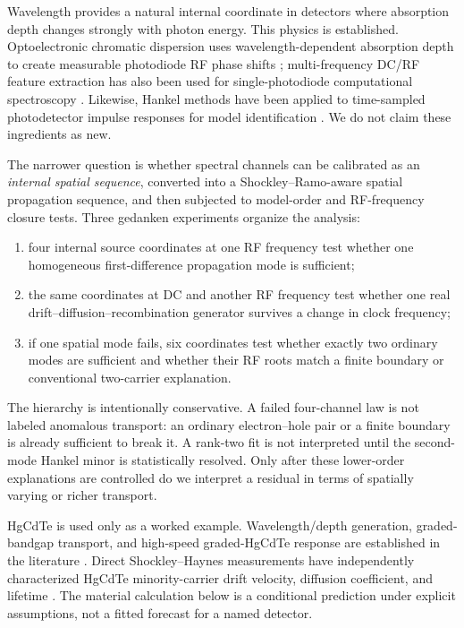 \documentclass[11pt]{article}
\begin{document}
Wavelength provides a natural internal coordinate in detectors where absorption depth changes strongly with photon energy. This physics is established. Optoelectronic chromatic dispersion uses wavelength-dependent absorption depth to create measurable photodiode RF phase shifts \cite{Glasser2021}; multi-frequency DC/RF feature extraction has also been used for single-photodiode computational spectroscopy \cite{Kassa2026}. Likewise, Hankel methods have been applied to time-sampled photodetector impulse responses for model identification \cite{Sun2025}. We do not claim these ingredients as new.

The narrower question is whether spectral channels can be calibrated as an \emph{internal spatial sequence}, converted into a Shockley--Ramo-aware spatial propagation sequence, and then subjected to model-order and RF-frequency closure tests. Three gedanken experiments organize the analysis:
\begin{enumerate}[label=(\roman*)]
    \item four internal source coordinates at one RF frequency test whether one homogeneous first-difference propagation mode is sufficient;
    \item the same coordinates at DC and another RF frequency test whether one real drift--diffusion--recombination generator survives a change in clock frequency;
    \item if one spatial mode fails, six coordinates test whether exactly two ordinary modes are sufficient and whether their RF roots match a finite boundary or conventional two-carrier explanation.
\end{enumerate}

The hierarchy is intentionally conservative. A failed four-channel law is not labeled anomalous transport: an ordinary electron--hole pair or a finite boundary is already sufficient to break it. A rank-two fit is not interpreted until the second-mode Hankel minor is statistically resolved. Only after these lower-order explanations are controlled do we interpret a residual in terms of spatially varying or richer transport.

HgCdTe is used only as a worked example. Wavelength/depth generation, graded-bandgap transport, and high-speed graded-HgCdTe response are established in the literature \cite{Sang2022}. Direct Shockley--Haynes measurements have independently characterized HgCdTe minority-carrier drift velocity, diffusion coefficient, and lifetime \cite{Rothman2010}. The material calculation below is a conditional prediction under explicit assumptions, not a fitted forecast for a named detector.
\end{document}
